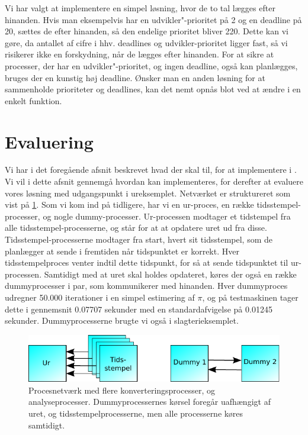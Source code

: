 Vi har valgt at implementere en simpel løsning, hvor  de to tal lægges efter hinanden. Hvis man eksempelvis har en udvikler"-prioritet på 2 og en deadline på 20, sættes de efter hinanden, så den endelige prioritet bliver 220. Dette kan vi gøre, da antallet af cifre i hhv. deadlines og udvikler-prioritet ligger fast, så vi risikerer ikke en forskydning, når de lægges efter hinanden. For at sikre at processer, der har en udvikler"-prioritet, og ingen deadline, også kan planlægges, bruges der en kunstig høj deadline. Ønsker man en anden løsning for at sammenholde prioriteter og deadlines, kan det nemt opnås blot ved at ændre i en enkelt funktion.
    
\section{Evaluering}
Vi har i det foregående afsnit beskrevet hvad der skal til, for at implementere \is i \pycsp. Vi vil i dette afsnit gennemgå hvordan \is kan implementeres, for derefter at evaluere vores løsning med udgangspunkt i ureksemplet.
Netværket er struktureret som vist på \cref{fig:watch_network}. Som vi kom ind på tidligere, har vi en ur-proces, en række tidsstempel-processer, og nogle dummy-processer. Ur-processen modtager et tidstempel fra alle  tidsstempel-processerne, og står for at at opdatere uret ud fra disse. Tidsstempel-processerne modtager fra start, hvert sit tidsstempel, som de planlægger at sende i fremtiden når tidspunktet er korrekt. Hver tidsstempelproces  venter indtil dette tidspunkt, for så at sende tidspunktet til ur-processen. Samtidigt med at uret skal holdes opdateret, køres der også en række dummyprocesser i par, som kommunikerer med hinanden. Hver dummyproces udregner 50.000 iterationer i en simpel estimering af $\pi$, og på testmaskinen tager dette i gennemsnit 0.07707 sekunder med en standardafvigelse på 0.01245 sekunder. Dummyprocesserne brugte vi også i slagterieksemplet.
\begin{figure}
 \begin{center}
  \includegraphics[scale=1]{images/watch-network}
	\caption{Procesnetværk med flere konverteringsprocesser, og analyseprocesser. Dummyprocessernes kørsel foregår uafhængigt af uret, og tidsstempelprocesserne, men alle processerne køres samtidigt.}
	\label{fig:watch_network}
\end{center}
\end{figure}

